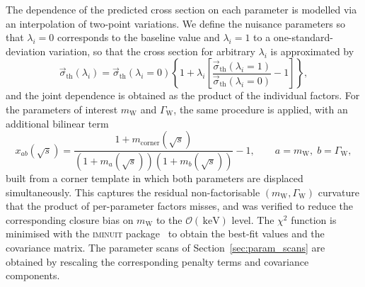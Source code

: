 \documentclass[a4paper,11pt]{article}
\newcommand{\sqrts}{\ensuremath{\sqrt{s}}\xspace}
\newcommand{\mW}{\ensuremath{m_\mathrm{W}}\xspace}
\newcommand{\GW}{\ensuremath{\Gamma_\mathrm{W}}\xspace}
\newcommand{\chisq}{\ensuremath{\chi^2}\xspace}
\newcommand{\keV}{\ensuremath{\,\mathrm{keV}}\xspace}
\begin{document}
The dependence of the predicted cross section on each parameter is
modelled via an interpolation of two-point variations. We define the
nuisance parameters so that $\lambda_i=0$ corresponds to the baseline
value and $\lambda_i=1$ to a one-standard-deviation variation, so that
the cross section for arbitrary $\lambda_i$ is approximated by
\begin{equation}
    \vec{\sigma}_\mathrm{th}(\lambda_i) =
    \vec{\sigma}_\mathrm{th}(\lambda_i=0)
    \left\{1 + \lambda_i\left[
    \frac{\vec{\sigma}_\mathrm{th}(\lambda_i=1)}
         {\vec{\sigma}_\mathrm{th}(\lambda_i=0)} - 1 \right]\right\},
\end{equation}
and the joint dependence is obtained as the product of the individual
factors. For the parameters of interest \mW and \GW, the same procedure
is applied, with an additional bilinear term
\begin{equation}
    x_{ab}(\sqrts) =
    \frac{1+m_\mathrm{corner}(\sqrts)}
         {(1+m_a(\sqrts))(1+m_b(\sqrts))} - 1,
    \qquad a=\mW,\; b=\GW,
\end{equation}
built from a corner template in which both parameters are displaced
simultaneously. This captures the residual non-factorisable $(\mW,\GW)$
curvature that the product of per-parameter factors misses, and was
verified to reduce the corresponding closure bias on \mW to the
$\mathcal{O}(\keV)$ level. The \chisq function is minimised with the
\textsc{iminuit} package~\cite{iminuit} to obtain the best-fit values
and the covariance matrix. The parameter scans of
Section~\ref{sec:param_scans} are obtained by rescaling the
corresponding penalty terms and covariance components.
\end{document}
